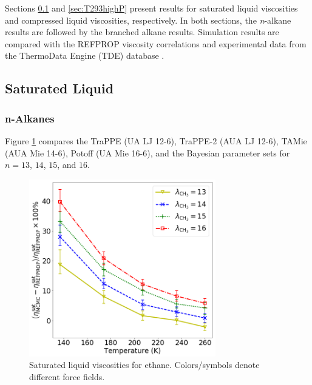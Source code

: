 \documentclass[preprint,review,12pt]{elsarticle}
\begin{document}
	Sections \ref{sec:eta_sat} and \ref{sec:T293highP} present results for saturated liquid viscosities and compressed liquid viscosities, respectively. In both sections, the \textit{n}-alkane results are followed by the branched alkane results. Simulation results are compared with the REFPROP viscosity correlations and experimental data from the ThermoData Engine (TDE) database \cite{TDE}.
	
	\subsection{Saturated Liquid} \label{sec:eta_sat}
	
	\subsubsection{n-Alkanes}
	
	
	
	Figure \ref{fig:Saturation_Ethane} compares the TraPPE (UA LJ 12-6), TraPPE-2 (AUA LJ 12-6), TAMie (AUA Mie 14-6), Potoff (UA Mie 16-6), and the Bayesian parameter sets for $n = 13$, $14$, $15$, and $16$.
	
	\begin{figure}[htb!]
		\centering
		\includegraphics[width=3.2in]{compare_force_fields_ethane.png}
		\caption{Saturated liquid viscosities for ethane. Colors/symbols denote different force fields.}
		\label{fig:Saturation_Ethane}
	\end{figure} 
	
\end{document}
